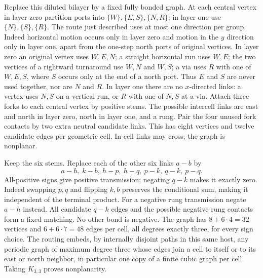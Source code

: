 Replace this diluted bilayer by a fixed fully bonded graph. At each central vertex in layer zero partition ports into \(\{W\},\{E,S\},\{N,R\}\); in layer one use \(\{N\},\{S\},\{R\}\). The route just described uses at most one direction per group. Indeed horizontal motion occurs only in layer zero and motion in the \(y\) direction only in layer one, apart from the one-step north ports of original vertices. In layer zero an original vertex uses \(W,E,N\); a straight horizontal run uses \(W,E\); the two vertices of a rightward turnaround use \(W,N\) and \(W,S\); a via uses \(R\) with one of \(W,E,S\), where \(S\) occurs only at the end of a north port. Thus \(E\) and \(S\) are never used together, nor are \(N\) and \(R\). In layer one there are no \(x\)-directed links: a vertex uses \(N,S\) on a vertical run, or \(R\) with one of \(N,S\) at a via. Attach three forks to each central vertex by positive stems. The possible intercell links are east and north in layer zero, north in layer one, and a rung. Pair the four unused fork contacts by two extra neutral candidate links. This has eight vertices and twelve candidate edges per geometric cell. In-cell links may cross; the graph is nonplanar.

Keep the six stems. Replace each of the other six links \(a-b\) by
\[
 a-h,\ k-b,\ h-p,\ h-q,\ p-k,\ q-k,\ p-q.
\]
All-positive signs give positive transmission; negating \(q-k\) makes it exactly zero. Indeed swapping \(p,q\) and flipping \(k,b\) preserves the conditional sum, making it independent of the terminal product. For a negative rung transmission negate \(a-h\) instead. All candidate \(q-k\) edges and the possible negative rung contacts form a fixed matching. No other bond is negative. The graph has \(8+6\cdot4=32\) vertices and \(6+6\cdot7=48\) edges per cell, all degrees exactly three, for every sign choice. The routing embeds, by internally disjoint paths in this same host, any periodic graph of maximum degree three whose edges join a cell to itself or to its east or north neighbor, in particular one copy of a finite cubic graph per cell. Taking \(K_{3,3}\) proves nonplanarity.

